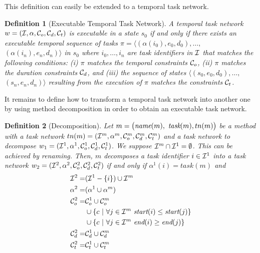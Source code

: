 \documentclass[letterpaper]{article} %
\newtheorem{definition}{Definition}
\newcommand{\name}{\text{\it name}}
\newcommand{\tstart}{\text{\it start}}
\newcommand{\tend}{\text{\it end}}
\newcommand{\task}{\text{\it task}}
\begin{document}
 This definition can easily be extended to a temporal task network.

  \begin{definition}[Executable Temporal Task Network] A temporal task network $w = ({\cal{I}}, \alpha, {\cal{C}}_o, {\cal{C}}_d, {\cal{C}}_t)$ is executable in a state $s_0$ if and only if there exists an executable temporal sequence of tasks $\pi = \langle (\alpha(i_0), e_0, d_0), \ldots,$ $(\alpha(i_n), e_n, d_n)\rangle$ in $s_0$ where $i_0, \ldots, i_n$ are task identifiers in $\cal{I}$ that matches the following conditions: (i) $\pi$ matches the temporal constraints ${\cal{C}}_o$, (ii) $\pi$ matches the duration constraints ${\cal{C}}_d$, and (iii) the sequence of states $\langle (s_0, e_0, d_0), \ldots,$ $(s_n, e_n, d_n) \rangle$ resulting from the execution of $\pi$ matches the constraints ${\cal{C}}_t$.
  \end{definition}

It remains to define how to transform a temporal task network into another one by using method decomposition in order to obtain an executable task network.

\begin{definition}[Decomposition]
Let $m = \bigl(\name(m),$ $\task(m), tn(m)\bigr)$ be a method with a task network $tn(m) = ({\cal{I}}^m, \alpha^m, {\cal{C}}_{o}^{m},{\cal{C}}_{d}^{m}, {\cal{C}}_{t}^{m})$ and a task network to decompose $w_1= ({\cal{I}}^1, \alpha^1, {\cal{C}}_{o}^{1},{\cal{C}}_{d}^{1}, {\cal{C}}_{t}^{1})$. We suppose ${\cal{I}}^m \cap {\cal{I}}^1 = \emptyset$. This can be achieved by renaming. Then, $m$ decomposes a task identifier $i \in {\cal{I}}^1$ into a task network $w_2= ({\cal{I}}^2, \alpha^2, {\cal{C}}_{o}^{2},{\cal{C}}_{d}^{2}, {\cal{C}}_{t}^{2})$ if and only if $\alpha^1(i) = task(m)$ and
\begin{equation*} \label{eq1}
\begin{aligned}
{\cal{I}}^2 = & ({\cal{I}}^1 - \{i\}) \cup {\cal{I}}^m\\
\alpha^2 = & (\alpha^1 \cup \alpha^m)\\
{\cal{C}}^{2}_{o} = & {\cal{C}}^{1}_{o} \cup {\cal{C}}^{m}_{o} \\
        & \cup \{ c \ | \ \forall j \in {\cal{I}}^m \ \tstart(i) \leq \tstart(j) \}  \\
        & \cup \{ c \ | \ \forall j \in {\cal{I}}^m \ \tend(i) \geq \tend(j) \}  \\
{\cal{C}}^{2}_{d}  = & {\cal{C}}^{1}_{d} \cup {\cal{C}}^{m}_{d} \\
{\cal{C}}^{2}_{t}  = & {\cal{C}}^{1}_{t} \cup {\cal{C}}^{m}_{t} \\
\end{aligned}
\end{equation*}
\end{definition}
\end{document}
